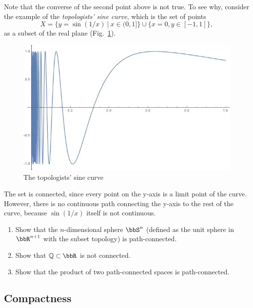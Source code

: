 Note that the converse of the second point above is not true. To see why, consider the example of the \emph{topologists' sine curve}, which is the set of points
\begin{equation}
X = \{y = \sin(1/x) ~|~ x\in(0,1]\} \cup \{ x=0, y\in[-1,1] \},
\end{equation}
as a subset of the real plane (Fig.\ \ref{tsine}).
\begin{figure}[tp]
    \centering
    \includegraphics[scale=0.3]{figures/Top_sin.jpg}
    \caption{The topologists' sine curve}
    \label{tsine}
\end{figure}
The set is connected, since every point on the y-axis is a limit point of the curve. However, there is no continuous path connecting the y-axis to the rest of the curve, because $\sin(1/x)$ itself is not continuous.

\begin{xca}
    \begin{enumerate}
        \item Show that the $n$-dimensional sphere $\bbS^n$ (defined as the unit sphere in $\bbR^{n+1}$ with the subset topology) is path-connected.
        \item Show that $\mathbb{Q}\subset\bbR $ is not connected.
        \item Show that the product of two path-connected spaces is path-connected.
    \end{enumerate}
\end{xca}





\subsection{Compactness}

